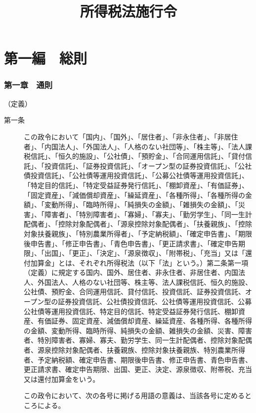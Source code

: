 \documentclass[twocolumn,a4j,10pt]{ltjtarticle}
\title{所得税法施行令}
\author{}
\date{}
\begin{document}
\maketitle
\tableofcontents
\part*{第一編　総則}
\section*{第一章　通則}
\noindent\hspace{10pt}（定義）
\begin{description}
\item[第一条]この政令において「国内」、「国外」、「居住者」、「非永住者」、「非居住者」、「内国法人」、「外国法人」、「人格のない社団等」、「株主等」、「法人課税信託」、「恒久的施設」、「公社債」、「預貯金」、「合同運用信託」、「貸付信託」、「投資信託」、「証券投資信託」、「オープン型の証券投資信託」、「公社債投資信託」、「公社債等運用投資信託」、「公募公社債等運用投資信託」、「特定目的信託」、「特定受益証券発行信託」、「棚卸資産」、「有価証券」、「固定資産」、「減価償却資産」、「繰延資産」、「各種所得」、「各種所得の金額」、「変動所得」、「臨時所得」、「純損失の金額」、「雑損失の金額」、「災害」、「障害者」、「特別障害者」、「寡婦」、「寡夫」、「勤労学生」、「同一生計配偶者」、「控除対象配偶者」、「源泉控除対象配偶者」、「扶養親族」、「控除対象扶養親族」、「特別農業所得者」、「予定納税額」、「確定申告書」、「期限後申告書」、「修正申告書」、「青色申告書」、「更正請求書」、「確定申告期限」、「出国」、「更正」、「決定」、「源泉徴収」、「附帯税」、「充当」又は「還付加算金」とは、それぞれ所得税法（以下「法」という。）第二条第一項（定義）に規定する国内、国外、居住者、非永住者、非居住者、内国法人、外国法人、人格のない社団等、株主等、法人課税信託、恒久的施設、公社債、預貯金、合同運用信託、貸付信託、投資信託、証券投資信託、オープン型の証券投資信託、公社債投資信託、公社債等運用投資信託、公募公社債等運用投資信託、特定目的信託、特定受益証券発行信託、棚卸資産、有価証券、固定資産、減価償却資産、繰延資産、各種所得、各種所得の金額、変動所得、臨時所得、純損失の金額、雑損失の金額、災害、障害者、特別障害者、寡婦、寡夫、勤労学生、同一生計配偶者、控除対象配偶者、源泉控除対象配偶者、扶養親族、控除対象扶養親族、特別農業所得者、予定納税額、確定申告書、期限後申告書、修正申告書、青色申告書、更正請求書、確定申告期限、出国、更正、決定、源泉徴収、附帯税、充当又は還付加算金をいう。
\item[]この政令において、次の各号に掲げる用語の意義は、当該各号に定めるところによる。

\end{description}
\end{document}
